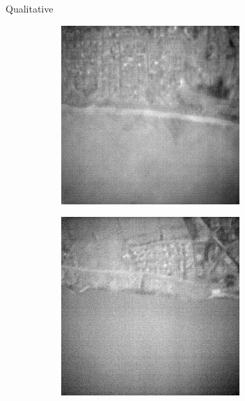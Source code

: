 \begin{frame}{Qualitative}
\begin{figure}
\begin{subfigure}[b]{0.24\textwidth}
            \label{fig:cut}
        \end{subfigure}
        \hfill
        \begin{subfigure}[b]{0.24\textwidth}
            \centering
            \includegraphics[width=\textwidth]{../figs/outputs/petit/28.png}
            \label{fig:petit}
        \end{subfigure}
        \hfill
        \begin{subfigure}[b]{0.24\textwidth}
            \centering
            \includegraphics[width=\textwidth]{../figs/outputs/mono/994.png}
            \label{fig:mono}
        \end{subfigure}
    

\end{figure}
\end{frame}
